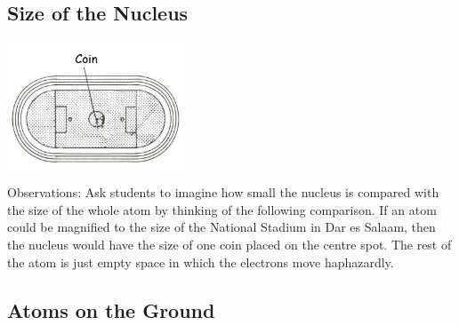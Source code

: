 \begin{multicols}{2}
\subsection{Size of the Nucleus}

\begin{center}
\includegraphics[width=0.4\textwidth]{./img/source/size-nucleus.jpg}
\end{center}

\begin{description*}
\item[Observations:]{Ask students to imagine how small the
nucleus is compared with the size of the whole
atom by thinking of the following comparison.
If an atom could be magnified to the size of the
National Stadium in Dar es Salaam, then the
nucleus would have the size of one coin
placed on the centre spot. The rest of the atom is
just empty space in which the electrons move
haphazardly.}
\end{description*}

\columnbreak

\subsection{Atoms on the Ground}


\end{multicols}
